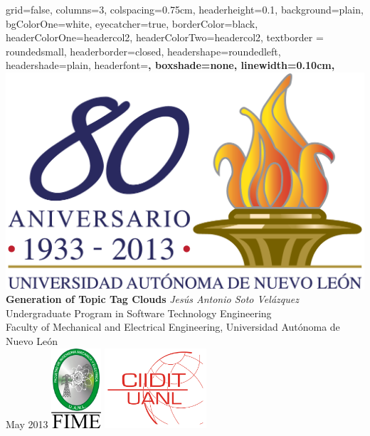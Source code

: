 \documentclass[a0paper, portrait]{baposter}
\begin{document}
\sffamily
\begin{poster}{
    grid=false,
    columns=3,
    colspacing=0.75cm, %
    headerheight=0.1\textheight,
    background=plain,
    bgColorOne=white,
    eyecatcher=true,
    borderColor=black,
    headerColorOne=headercol2,
    headerColorTwo=headercol2,
    textborder = roundedsmall,
    headerborder=closed,
    headershape=roundedleft,
    headershade=plain,
    headerfont=\Large\sffamily\bfseries,
    boxshade=none,
    linewidth=0.10cm,    
}
  { \includegraphics[height=0.1\textheight]{uanl.png} }
  {
    \bf\sf Generation of Topic Tag Clouds
  }
  {
    {\it Jes\'us Antonio Soto Vel\'azquez} \\
    \small {
    Undergraduate Program in Software Technology Engineering \\
    Faculty of Mechanical and Electrical Engineering, Universidad Aut\'onoma de Nuevo Le\'on \\
    May 2013        
    }
  }
  {
    \includegraphics[height=8.0em]{fime.pdf}
    \hspace{2.0em}
    \includegraphics[height=8.0em]{ciidit.png}
  }


\end{poster}
\end{document}
